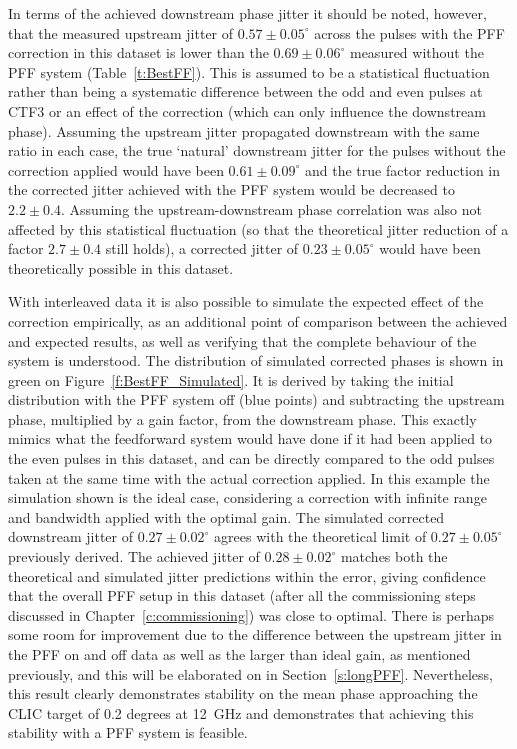 In terms of the achieved downstream phase jitter it should be noted, however, that the measured upstream jitter of \(0.57\pm0.05^\circ\) across the pulses with the PFF correction in this dataset is lower than the \(0.69\pm0.06^\circ\) measured without the PFF system (Table~\ref{t:BestFF}). This is assumed to be a statistical fluctuation rather than being a systematic difference between the odd and even pulses at CTF3 or an effect of the correction (which can only influence the downstream phase). Assuming the upstream jitter propagated downstream with the same ratio in each case, the true `natural' downstream jitter for the pulses without the correction applied would have been \(0.61\pm0.09^\circ\) and the true factor reduction in the corrected jitter achieved with the PFF system would be decreased to \(2.2\pm0.4\). Assuming the upstream-downstream phase correlation was also not affected by this statistical fluctuation (so that the theoretical jitter reduction of a factor \(2.7\pm0.4\) still holds), a corrected jitter of \(0.23\pm0.05^\circ\) would have been theoretically possible in this dataset.

With interleaved data it is also possible to simulate the expected effect of the correction empirically, as an additional point of comparison between the achieved and expected results, as well as verifying that the complete behaviour of the system is understood. The distribution of simulated corrected phases is shown in green on Figure~\ref{f:BestFF_Simulated}. It is derived by taking the initial distribution with the PFF system off (blue points) and subtracting the upstream phase, multiplied by a gain factor, from the downstream phase. This exactly mimics what the feedforward system would have done if it had been applied to the even pulses in this dataset, and can be directly compared to the odd pulses taken at the same time with the actual correction applied. In this example the simulation shown is the ideal case, considering a correction with infinite range and bandwidth applied with the optimal gain. The simulated corrected downstream jitter of \(0.27\pm0.02^\circ\) agrees with the theoretical limit of \(0.27\pm0.05^\circ\) previously derived. The achieved jitter of \(0.28\pm0.02^\circ\) matches both the theoretical and simulated jitter predictions within the error, giving confidence that the overall PFF setup in this dataset (after all the commissioning steps discussed in Chapter~\ref{c:commissioning}) was close to optimal. There is perhaps some room for improvement due to the difference between the upstream jitter in the PFF on and off data as well as the larger than ideal gain, as mentioned previously, and this will be elaborated on in Section~\ref{s:longPFF}. Nevertheless, this result clearly demonstrates stability on the mean phase approaching the CLIC target of 0.2 degrees at 12~GHz and demonstrates that achieving this stability with a PFF system is feasible.


